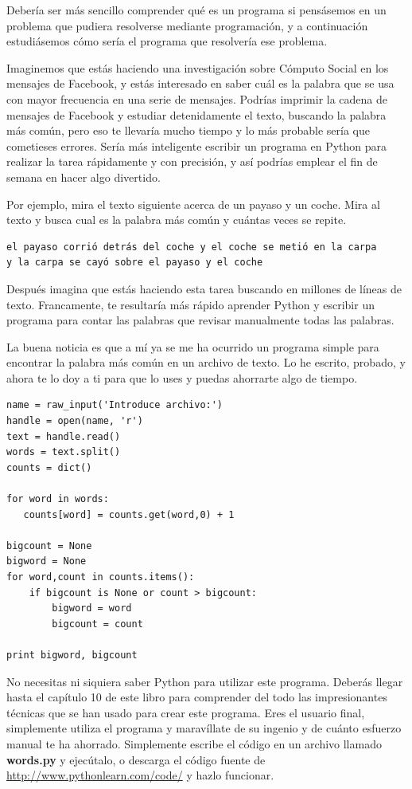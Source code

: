 Debería ser más sencillo comprender qué es un programa si pensásemos en un problema
que pudiera resolverse mediante programación, y a continuación estudiásemos cómo sería el
programa que resolvería ese problema.

Imaginemos que estás haciendo una investigación sobre Cómputo Social en los mensajes
de Facebook, y estás interesado en saber cuál es la palabra que se usa con mayor frecuencia
en una serie de mensajes. Podrías imprimir la cadena de mensajes de Facebook y estudiar
detenidamente el texto, buscando la palabra más común, pero eso te llevaría mucho tiempo
y lo más probable sería que cometieses errores. Sería más inteligente escribir un programa
en Python para realizar la tarea rápidamente y con precisión, y así podrías emplear el fin
de semana en hacer algo divertido.

Por ejemplo, mira el texto siguiente acerca de un payaso y un coche. Mira al
texto y busca cual es la palabra más común y cuántas veces se repite.

\beforeverb
\begin{verbatim}
el payaso corrió detrás del coche y el coche se metió en la carpa
y la carpa se cayó sobre el payaso y el coche
\end{verbatim}
\afterverb
%
Después imagina que estás haciendo esta tarea buscando en millones de líneas de
texto. Francamente, te resultaría más rápido aprender Python y escribir un
programa para contar las palabras que revisar manualmente todas las palabras.

La buena noticia es que a mí ya se me ha ocurrido un programa
simple para encontrar la palabra más común en un archivo de texto. Lo he escrito,
probado, y ahora te lo doy a ti para que lo uses y puedas ahorrarte algo de tiempo.

\beforeverb
\begin{verbatim}
name = raw_input('Introduce archivo:')
handle = open(name, 'r')
text = handle.read()
words = text.split()
counts = dict()

for word in words:
   counts[word] = counts.get(word,0) + 1

bigcount = None
bigword = None
for word,count in counts.items():
    if bigcount is None or count > bigcount:
        bigword = word
        bigcount = count

print bigword, bigcount
\end{verbatim}
\afterverb
%
No necesitas ni siquiera saber Python para utilizar este programa. Deberás llegar hasta
el capítulo 10 de este libro para comprender del todo las impresionantes técnicas que
se han usado para crear este programa. Eres el usuario final, simplemente utiliza el
programa y maravíllate de su ingenio y de cuánto esfuerzo manual te ha ahorrado.
Simplemente escribe el código
en un archivo llamado {\bf words.py} y ejecútalo, o descarga el código fuente
de \url{http://www.pythonlearn.com/code/} y hazlo funcionar.

